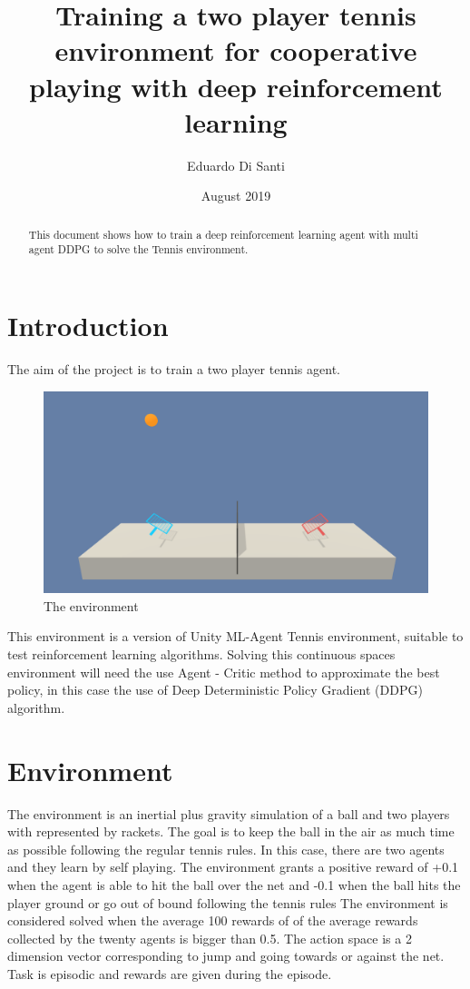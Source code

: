 \documentclass{article}
\author{Eduardo Di Santi }
\date{August 2019}
\title{Training a two player tennis environment for cooperative playing with deep reinforcement learning}
\begin{document}
\maketitle
\begin{abstract}
This document shows how to train a deep reinforcement learning agent with multi agent DDPG to solve the Tennis environment.
\end{abstract}

\section{Introduction}
The aim of the project is to train a two player tennis agent.

\begin{figure}[!htbp]
\centering
\includegraphics[scale=0.12]{tennis.png}
\caption{The environment}
\label{fig:tennis}
\end{figure}
This environment is a version of Unity ML-Agent Tennis environment, suitable to test reinforcement learning algorithms. Solving this continuous spaces environment will need the use Agent - Critic \cite{actcrit} method to approximate the best policy, in this case the use of Deep Deterministic Policy Gradient (DDPG) algorithm. 

\section{Environment}

The environment is an inertial plus gravity simulation of a ball and two players with represented by rackets. The goal is to keep the ball in the air as much time as possible following the regular tennis rules.
In this case, there are two agents and they learn by self playing.
The environment grants a positive reward of +0.1 when the agent is able to hit the ball over the net and -0.1 when the ball hits the player ground or go out of bound following the tennis rules \newline
The environment is considered solved when the average 100 rewards of of the average rewards collected by the twenty agents is bigger than 0.5.\newline
The action space is a 2 dimension vector corresponding to jump and going towards or against the net.\newline
Task is episodic and rewards are given during the episode.
\end{document}
